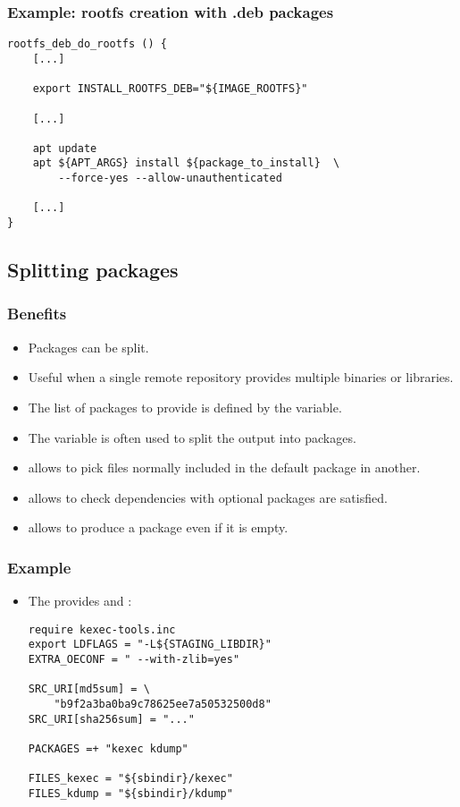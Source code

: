 \begin{frame}[fragile]
  \frametitle{Example: rootfs creation with .deb packages}
  \begin{block}{}
    \begin{verbatim}
rootfs_deb_do_rootfs () {
    [...]

    export INSTALL_ROOTFS_DEB="${IMAGE_ROOTFS}"

    [...]

    apt update
    apt ${APT_ARGS} install ${package_to_install}  \
        --force-yes --allow-unauthenticated

    [...]
}
    \end{verbatim}
  \end{block}
\end{frame}

\subsection{Splitting packages}

\begin{frame}
  \frametitle{Benefits}
  \begin{itemize}
    \item Packages can be split.
    \item Useful when a single remote repository provides multiple
      binaries or libraries.
    \item The list of packages to provide is defined by the
       variable.
    \item The  variable is often used to split the output
      into packages.
    \item {} allows to pick files normally included in the
      default package in another.
    \item {} allows to check dependencies with optional
      packages are satisfied.
    \item {} allows to produce a package even if it is empty.
  \end{itemize}
\end{frame}

\begin{frame}[fragile]
  \frametitle{Example}
  \begin{itemize}
    \item The  provides  and :
    \begin{block}{}
    \begin{verbatim}
require kexec-tools.inc
export LDFLAGS = "-L${STAGING_LIBDIR}"
EXTRA_OECONF = " --with-zlib=yes"

SRC_URI[md5sum] = \
    "b9f2a3ba0ba9c78625ee7a50532500d8"
SRC_URI[sha256sum] = "..."

PACKAGES =+ "kexec kdump"

FILES_kexec = "${sbindir}/kexec"
FILES_kdump = "${sbindir}/kdump"
    \end{verbatim}
    \end{block}
  \end{itemize}
\end{frame}

